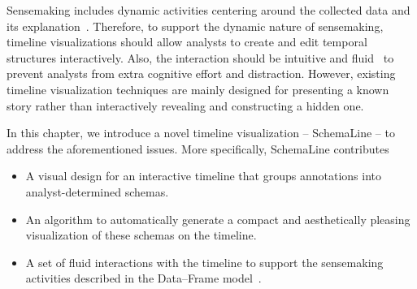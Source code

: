 Sensemaking includes dynamic activities centering around the collected data and its explanation~\cite{Klein2003}. Therefore, to support the dynamic nature of sensemaking, timeline visualizations should allow analysts to create and edit temporal structures interactively. Also, the interaction should be intuitive and fluid~\cite{Elmqvist2011} to prevent analysts from extra cognitive effort and distraction. However, existing timeline visualization techniques are mainly designed for presenting a known story rather than interactively revealing and constructing a hidden one.

In this chapter, we introduce a novel timeline visualization -- SchemaLine -- to address the aforementioned issues. More specifically, SchemaLine contributes
\begin{itemize}
	\item A visual design for an interactive timeline that groups annotations into analyst-determined schemas.
	\item An algorithm to automatically generate a compact and aesthetically pleasing visualization of these schemas on the timeline.
	\item A set of fluid interactions with the timeline to support the sensemaking activities described in the Data--Frame model~\cite{Klein2003}.
\end{itemize}